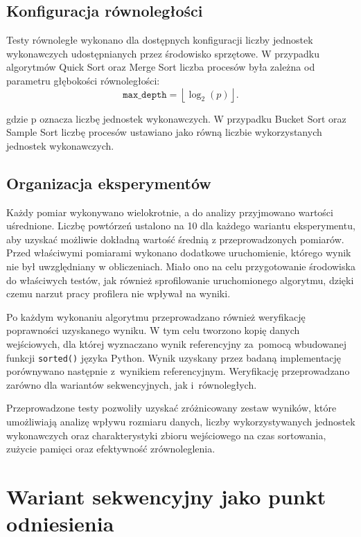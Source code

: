 \subsection*{Konfiguracja równoległości}

Testy równoległe wykonano dla dostępnych konfiguracji liczby jednostek wykonawczych udostępnianych przez środowisko sprzętowe. 
W przypadku algorytmów Quick Sort oraz Merge Sort liczba procesów była zależna od parametru głębokości równoległości:
\begin{equation}
    \texttt{max\_depth} = \left\lfloor \log_2(p) \right\rfloor.
\end{equation}

gdzie p oznacza liczbę jednostek wykonawczych. W przypadku Bucket Sort oraz Sample Sort 
liczbę procesów ustawiano jako równą liczbie wykorzystanych jednostek wykonawczych.

\subsection*{Organizacja eksperymentów}

Każdy pomiar wykonywano wielokrotnie, a do analizy przyjmowano wartości uśrednione. 
Liczbę powtórzeń ustalono na 10 dla każdego wariantu eksperymentu, 
aby uzyskać możliwie dokładną wartość średnią z przeprowadzonych pomiarów. Przed właściwymi pomiarami wykonano dodatkowe uruchomienie,
którego wynik nie był uwzględniany w obliczeniach. Miało ono na celu przygotowanie środowiska do właściwych testów, jak również 
sprofilowanie uruchomionego algorytmu, dzięki czemu narzut pracy profilera nie wpływał na wyniki.

Po każdym wykonaniu algorytmu przeprowadzano również weryfikację poprawności uzyskanego wyniku. 
W tym celu tworzono kopię danych wejściowych, dla której wyznaczano wynik referencyjny 
za~pomocą wbudowanej funkcji \texttt{sorted()} języka Python. 
Wynik uzyskany przez badaną implementację porównywano następnie z~wynikiem referencyjnym.
Weryfikację przeprowadzano zarówno dla wariantów sekwencyjnych, jak i~równoległych.

Przeprowadzone testy pozwoliły uzyskać zróżnicowany zestaw wyników, które umożliwiają analizę wpływu rozmiaru danych, 
liczby wykorzystywanych jednostek wykonawczych oraz charakterystyki zbioru wejściowego na czas sortowania, zużycie pamięci oraz efektywność zrównoleglenia.

\section{Wariant sekwencyjny jako punkt odniesienia}
\label{sec:WariantSekwencyjny}

